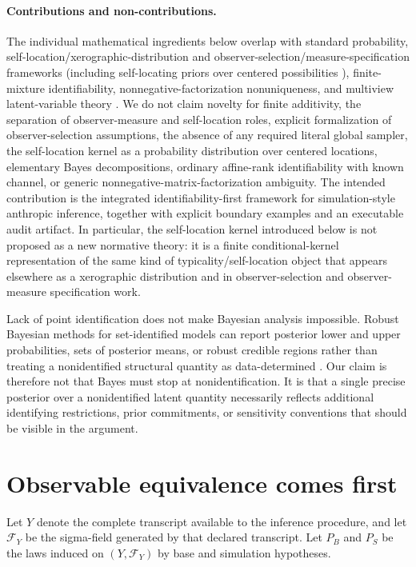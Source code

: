 \documentclass[11pt]{article}
\begin{document}
\paragraph{Contributions and non-contributions.}
The individual mathematical ingredients below overlap with standard probability, self-location/xerographic-distribution and observer-selection/measure-specification frameworks (including self-locating priors over centered possibilities \citep{dorrarntzenius2017}), finite-mixture identifiability, nonnegative-factorization nonuniqueness, and multiview latent-variable theory \citep{srednickihartle2013,garisto2020,uchida2026,allman2009,gillis2020}. We do not claim novelty for finite additivity, the separation of observer-measure and self-location roles, explicit formalization of observer-selection assumptions, the absence of any required literal global sampler, the self-location kernel as a probability distribution over centered locations, elementary Bayes decompositions, ordinary affine-rank identifiability with known channel, or generic nonnegative-matrix-factorization ambiguity. The intended contribution is the integrated identifiability-first framework for simulation-style anthropic inference, together with explicit boundary examples and an executable audit artifact. In particular, the self-location kernel introduced below is not proposed as a new normative theory: it is a finite conditional-kernel representation of the same kind of typicality/self-location object that appears elsewhere as a xerographic distribution and in observer-selection and observer-measure specification work.

Lack of point identification does not make Bayesian analysis impossible. Robust Bayesian methods for set-identified models can report posterior lower and upper probabilities, sets of posterior means, or robust credible regions rather than treating a nonidentified structural quantity as data-determined \citep{giacomini2021}. Our claim is therefore not that Bayes must stop at nonidentification. It is that a single precise posterior over a nonidentified latent quantity necessarily reflects additional identifying restrictions, prior commitments, or sensitivity conventions that should be visible in the argument.

\section{Observable equivalence comes first}
Let $Y$ denote the complete transcript available to the inference procedure, and let $\mathcal F_Y$ be the sigma-field generated by that declared transcript. Let $P_B$ and $P_S$ be the laws induced on $(Y,\mathcal F_Y)$ by base and simulation hypotheses.
\end{document}
